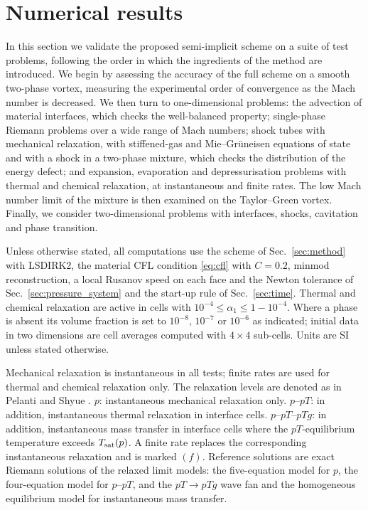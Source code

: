 \section{Numerical results}
\label{sec:results}

In this section we validate the proposed semi-implicit scheme on a suite of test problems, following the order in
which the ingredients of the method are introduced. We begin by assessing the accuracy of the full scheme on a smooth
two-phase vortex, measuring the experimental order of convergence as the Mach number is decreased. We then turn to
one-dimensional problems: the advection of material interfaces, which checks the well-balanced property; single-phase
Riemann problems over a wide range of Mach numbers; shock tubes with mechanical relaxation, with stiffened-gas and
Mie--Gr\"uneisen equations of state and with a shock in a two-phase mixture, which checks the distribution of the
energy defect; and expansion, evaporation and depressurisation problems with thermal and chemical relaxation, at
instantaneous and finite rates. The low Mach number limit of the mixture is then examined on the Taylor--Green
vortex. Finally, we consider two-dimensional problems with interfaces, shocks, cavitation and phase transition.

Unless otherwise stated, all computations use the scheme of Sec.~\ref{sec:method} with LSDIRK2, the material CFL condition
\eqref{eq:cfl} with $C=0.2$, minmod reconstruction, a local Rusanov speed on each face and the Newton tolerance of
Sec.~\ref{sec:pressure_system} and the start-up rule of Sec.~\ref{sec:time}. Thermal and chemical relaxation
are active in cells with $10^{-4}\le\alpha_1\le1-10^{-4}$. Where a phase is absent its volume fraction is set to $10^{-8}$, $10^{-7}$ or
$10^{-6}$ as indicated; initial data in two dimensions are cell averages computed with $4\times4$ sub-cells. Units are SI
unless stated otherwise.

Mechanical relaxation is instantaneous in all tests; finite rates are used for thermal and chemical relaxation only.
The relaxation levels are denoted as in Pelanti and Shyue \cite{PelantiShyue2014}. $p$: instantaneous mechanical relaxation only.
$p$--$pT$: in addition, instantaneous thermal relaxation in interface cells. $p$--$pT$--$pTg$: in addition, instantaneous
mass transfer in interface cells where the $pT$-equilibrium temperature exceeds $T_{\rm sat}(p)$. A finite rate replaces the
corresponding instantaneous relaxation and is marked $(f)$. Reference solutions are exact Riemann solutions of the
relaxed limit models: the five-equation model for $p$, the four-equation model for $p$--$pT$, and the $pT\to pTg$ wave
fan and the homogeneous equilibrium model for instantaneous mass transfer.

